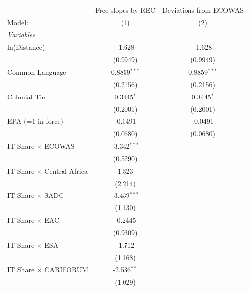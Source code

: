 
\begingroup
\centering
\begin{tabular}{lcc}
   \tabularnewline \midrule \midrule
                                     & Free slopes by REC & Deviations from ECOWAS \\   
   Model:                            & (1)                & (2)\\  
   \midrule
   \emph{Variables}\\
   ln(Distance)                      & -1.628             & -1.628\\   
                                     & (0.9949)           & (0.9949)\\   
   Common Language                   & 0.8859$^{***}$     & 0.8859$^{***}$\\   
                                     & (0.2156)           & (0.2156)\\   
   Colonial Tie                      & 0.3445$^{*}$       & 0.3445$^{*}$\\   
                                     & (0.2001)           & (0.2001)\\   
   EPA (=1 in force)                 & -0.0491            & -0.0491\\   
                                     & (0.0680)           & (0.0680)\\   
   IT Share $\times$ ECOWAS          & -3.342$^{***}$     &   \\   
                                     & (0.5290)           &   \\   
   IT Share $\times$ Central Africa  & 1.823              &   \\   
                                     & (2.214)            &   \\   
   IT Share $\times$ SADC            & -3.439$^{***}$     &   \\   
                                     & (1.130)            &   \\   
   IT Share $\times$ EAC             & -0.2445            &   \\   
                                     & (0.9309)           &   \\   
   IT Share $\times$ ESA             & -1.712             &   \\   
                                     & (1.168)            &   \\   
   IT Share $\times$ CARIFORUM       & -2.536$^{**}$      &   \\   
                                     & (1.029)            &   \\   

\end{tabular}
